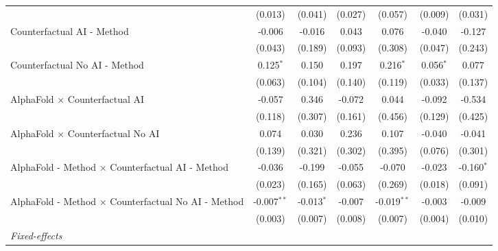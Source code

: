 \begin{tabular}{lcccccc}
                                                              & (0.013)       & (0.041)       & (0.027)       & (0.057)       & (0.009)       & (0.031)\\   
   Counterfactual AI - Method                                 & -0.006        & -0.016        & 0.043         & 0.076         & -0.040        & -0.127\\   
                                                              & (0.043)       & (0.189)       & (0.093)       & (0.308)       & (0.047)       & (0.243)\\   
   Counterfactual No AI - Method                              & 0.125$^{*}$   & 0.150         & 0.197         & 0.216$^{*}$   & 0.056$^{*}$   & 0.077\\   
                                                              & (0.063)       & (0.104)       & (0.140)       & (0.119)       & (0.033)       & (0.137)\\   
   AlphaFold $\times$ Counterfactual AI                       & -0.057        & 0.346         & -0.072        & 0.044         & -0.092        & -0.534\\   
                                                              & (0.118)       & (0.307)       & (0.161)       & (0.456)       & (0.129)       & (0.425)\\   
   AlphaFold $\times$ Counterfactual No AI                    & 0.074         & 0.030         & 0.236         & 0.107         & -0.040        & -0.041\\   
                                                              & (0.139)       & (0.321)       & (0.302)       & (0.395)       & (0.076)       & (0.301)\\   
   AlphaFold - Method $\times$ Counterfactual AI - Method     & -0.036        & -0.199        & -0.055        & -0.070        & -0.023        & -0.160$^{*}$\\   
                                                              & (0.023)       & (0.165)       & (0.063)       & (0.269)       & (0.018)       & (0.091)\\   
   AlphaFold - Method $\times$ Counterfactual No AI - Method  & -0.007$^{**}$ & -0.013$^{*}$  & -0.007        & -0.019$^{**}$ & -0.003        & -0.009\\   
                                                              & (0.003)       & (0.007)       & (0.008)       & (0.007)       & (0.004)       & (0.010)\\   
   \midrule
   \emph{Fixed-effects}\\

\end{tabular}
